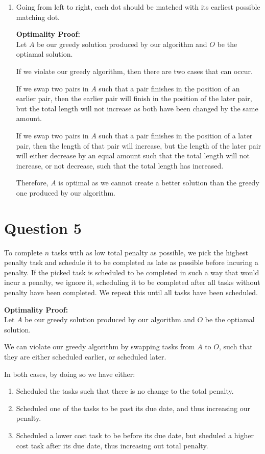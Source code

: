 \documentclass{article}
\begin{document}
\begin{enumerate}[label=\alph*)]
    \item
        Going from left to right, each dot should be matched with its earliest possible matching dot.

        \textbf{Optimality Proof:}\\
        Let $A$ be our greedy solution produced by our algorithm and $O$ be the optiamal solution.

        If we violate our greedy algorithm, then there are two cases that can occur.

        If we swap two pairs in $A$ such that a pair finishes in the position of an earlier pair, then the earlier pair will finish in the position of the later pair, but the total length will not increase as both have been changed by the same amount.

        If we swap two pairs in $A$ such that a pair finishes in the position of a later pair, then the length of that pair will increase, but the length of the later pair will either decrease by an equal amount such that the total length will not increase, or not decrease, such that the total length has increased.

        Therefore, $A$ is optimal as we cannot create a better solution than the greedy one produced by our algorithm.

\end{enumerate}

\section*{Question 5}
To complete $n$ tasks with as low total penalty as possible, we pick the highest penalty task and schedule it to be completed as late as possible before incuring a penalty. If the picked task is scheduled to be completed in such a way that would incur a penalty, we ignore it, scheduling it to be completed after all tasks without penalty have been completed. We repeat this until all tasks have been scheduled.

\textbf{Optimality Proof:}\\
Let $A$ be our greedy solution produced by our algorithm and $O$ be the optiamal solution.

We can violate our greedy algorithm by swapping tasks from $A$ to $O$, such that they are either scheduled earlier, or scheduled later.

In both cases, by doing so we have either:
\begin{enumerate}
    \item Scheduled the tasks such that there is no change to the total penalty.
    \item Scheduled one of the tasks to be past its due date, and thus increasing our penalty.
    \item Scheduled a lower cost task to be before its due date, but sheduled a higher cost task after its due date, thus increasing out total penalty.
\end{enumerate}
\end{document}

